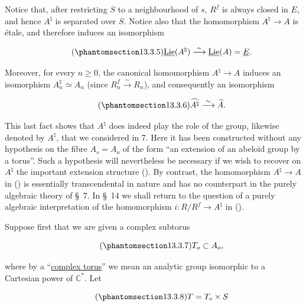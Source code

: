 \noindent
Notice that, after restricting $S$ to a neighbourhood of $s$, $R^f$ is
always closed in $E$, and hence $A^\natural$ is separated over $S$.
Notice also that the homomorphism $A^\natural\longrightarrow A$ is
\'etale, and therefore induces an isomorphism

\begin{equation}\tag{\SGARefTarget{sga7.sga7i.eix.n13-3-5}{13.3.5}}
 \underline{\operatorname{Lie}}(A^\natural)
 \stackrel{\sim}{\longrightarrow}
 \underline{\operatorname{Lie}}(A)=\underline E.
\end{equation}

\noindent
Moreover, for every $n\geqslant0$, the canonical homomorphism
$A^\natural\longrightarrow A$ induces an isomorphism
$A_n^\natural\simeq A_n$ (since $R_n^f\stackrel{\sim}{\longrightarrow}
R_n$), and consequently an isomorphism

\begin{equation}\tag{\SGARefTarget{sga7.sga7i.eix.n13-3-6}{13.3.6}}
 \widehat{A^\natural}\stackrel{\sim}{\longrightarrow}\widehat A.
\end{equation}

\noindent
This last fact shows that $A^\natural$ does indeed play the role of the
group, likewise denoted by $A^\natural$, that we considered in 7. Here
it has been constructed without any hypothesis on the fibre
$A_s=A_o$ of the form ``an extension of an abeloid group by a torus''.
Such a hypothesis will nevertheless be necessary if we wish to recover
on $A^\natural$ the important extension structure (). By contrast,
the homomorphism $A^\natural\longrightarrow A$ in () is essentially
transcendental in nature and has no counterpart in the purely algebraic
theory of \S~7. In \S~14 we shall return to the question of a purely
algebraic interpretation of the homomorphism
$i:R/R^f\longrightarrow A^\natural$ in ().

Suppose first that we are given a complex subtorus

\begin{equation}\tag{\SGARefTarget{sga7.sga7i.eix.n13-3-7}{13.3.7}}
 T_o\subset A_o,
\end{equation}

\noindent
where by a ``\underline{complex torus}'' we mean an analytic group
isomorphic to a Cartesian power of $\mathbb C^*$. Let

\begin{equation}\tag{\SGARefTarget{sga7.sga7i.eix.n13-3-8}{13.3.8}}
 T=T_o\times S
\end{equation}

